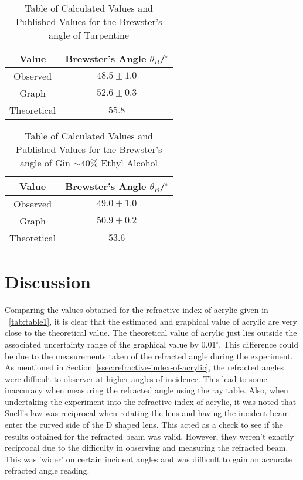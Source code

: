 \documentclass{article}
\newcommand{\tabref}[2][\tablename~]{#1\ref{#2}}
\newcommand{\secref}[2][Section~]{#1\ref{#2}}
\begin{document}
\vspace{10mm}
\begin{table*}[h]
\centering %
\caption{Table of Calculated Values and Published Values for the Brewster's angle of Turpentine}
\label{tab:table-turpentine3}
\begin{tabular}{|c|c|}
\hline
Value & Brewster's Angle $\theta_B$/$^{\circ}$ \\
\hline
Observed & $48.5 \pm 1.0$  \\
\hline
Graph & $52.6 \pm 0.3$ \\
\hline
Theoretical \cite{Web01} & $55.8$ \\
\hline
\end{tabular}
\end{table*}

\newpage
\vspace{5mm}
\begin{table*}[h]
\centering %
\caption{Table of Calculated Values and Published Values for the Brewster's angle of Gin $\sim40\%$ Ethyl Alcohol}
\label{tab:table-gin3}
\begin{tabular}{|c|c|}
\hline
Value & Brewster's Angle $\theta_B$/$^{\circ}$ \\
\hline
Observed & $49.0\pm 1.0$  \\
\hline
Graph & $50.9 \pm 0.2$ \\
\hline
Theoretical \cite{Web02} & $53.6$ \\
\hline
\end{tabular}
\end{table*}


\section{Discussion}
\label{sec:discussion}



Comparing the values obtained for the refractive index of acrylic given in \tabref{tab:table1}, it is clear that the estimated and graphical value of acrylic are very close to the theoretical value. The theoretical value of acrylic just lies outside the associated uncertainty range of the graphical value by 0.01$^{\circ}$. This difference could be due to the measurements taken of the refracted angle during the experiment. As mentioned in \secref{ssec:refractive-index-of-acrylic}, the refracted angles were difficult to observer at higher angles of incidence. This lead to some inaccuracy when measuring the refracted angle using the ray table. Also, when undertaking the experiment into the refractive index of acrylic, it was noted that Snell's law was reciprocal when rotating the lens and having the incident beam enter the curved side of the D shaped lens. This acted as a check to see if the results obtained for the refracted beam was valid. However, they weren't exactly reciprocal due to the difficulty in observing and measuring the refracted beam. This was 'wider' on certain incident angles and was difficult to gain an accurate refracted angle reading.
\end{document}
